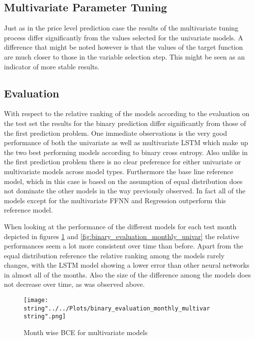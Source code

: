 \subsection{Multivariate Parameter Tuning}
Just as in the price level prediction case the results of the multivariate tuning process differ significantly from the values selected for the univariate models. A difference that might be noted however is that the values of the target function are much closer to those in the variable selection step. This might be seen as an indicator of more stable results. 

\subsection{Evaluation}
With respect to the relative ranking of the models according to the evaluation on the test set the results for the binary prediction differ significantly from those of the first prediction problem. One  immediate observations is the very good performance of both the univariate as well as multivariate LSTM which make up the two best performing models according to binary cross entropy. Also unlike in the first prediction problem there is no clear preference for either univariate or multivariate models across model types. Furthermore the base line reference model, which in this case is based on the assumption of equal distribution does not dominate the other models in the way previously observed. In fact all of the models except for the multivariate FFNN and Regression outperform this reference model. 


When looking at the performance of the different models for each test month depicted in figures \ref{fig:binary_evaluation_monthly_multivar} and \ref{fig:binary_evaluation_monthly_univar} the relative performances seem a lot more consistent over time than before. Apart from the equal distribution reference the relative ranking among the models rarely changes, with the LSTM model showing a lower error than other neural networks in almost all of the months. Also the size of the difference among the models does not decrease over time, as was observed above.
\begin{figure}[h!]
  \centering
\texttt{[image: \\string"../../Plots/binary\_evaluation\_monthly\_multivar\\string".png]}
  \caption{Month wise BCE for multivariate models}\label{fig:binary_evaluation_monthly_multivar}
\end{figure}

